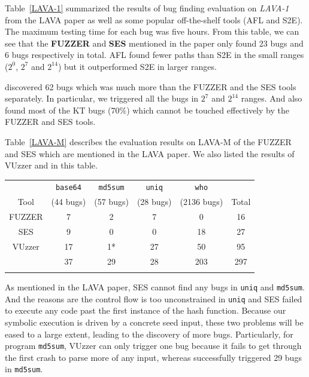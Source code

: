 Table~\ref{LAVA-1} summarized the results of bug finding evaluation on 
\textit{LAVA-1} from the LAVA paper as well as some popular off-the-shelf 
tools (AFL and S2E). The maximum testing time for each bug was five hours. 
From this table, we can see that the \textbf{FUZZER} and \textbf{SES} 
mentioned in the paper only found 23 bugs and 6 bugs respectively in total. 
AFL found fewer paths than S2E in the small ranges ($2^0$, $2^7$ and $2^{14}$) 
but it outperformed S2E in larger ranges. 

\prototype discovered 62 bugs which was much more than the FUZZER and the 
SES tools separately. In particular, we triggered all the bugs in $2^7$ and 
$2^{14}$ ranges. And also found most of the KT bugs (70\%) which cannot be 
touched effectively by the FUZZER and SES tools. 

Table~\ref{LAVA-M} describes the evaluation results on LAVA-M of the FUZZER 
and SES which are mentioned in the LAVA paper. We also listed the results 
of VUzzer and \prototype in this table. 
\begin{table}[!b]
{\begin{tabular*}{20pc}{@{\extracolsep{\fill}}cccccc@{}}\toprule
	     & \texttt{base64} & \texttt{md5sum} & \texttt{uniq} & \texttt{who} &   \\
	     Tool    & (44 bugs) & (57 bugs) & (28 bugs) & (2136 bugs) &  Total\\
\midrule
		FUZZER 		& 7  & 2  & 7    & 0   & 16  \\
		SES	        & 9  & 0  & 0    & 18  & 27  \\
		VUzzer		& 17 & 1* & 27   & 50  & 95 \\
		\prototype	& 37 & 29 & 28   & 203 & 297 \\
\botrule
\end{tabular*}}{}
\end{table}


As mentioned in the LAVA paper, SES cannot find any bugs in \texttt{uniq} and 
\texttt{md5sum}. And the reasons are the control flow is too unconstrained in 
\texttt{uniq} and SES failed to execute any code past the first instance of 
the hash function. Because our symbolic execution is driven by a concrete seed 
input, these two problems will be eased to a large extent, leading to the 
discovery of more bugs. Particularly, for program \texttt{md5sum}, VUzzer can 
only trigger one bug because it fails to get through the first crash to parse 
more of any input, whereas \prototype successfully triggered 29 bugs in 
\texttt{md5sum}.

